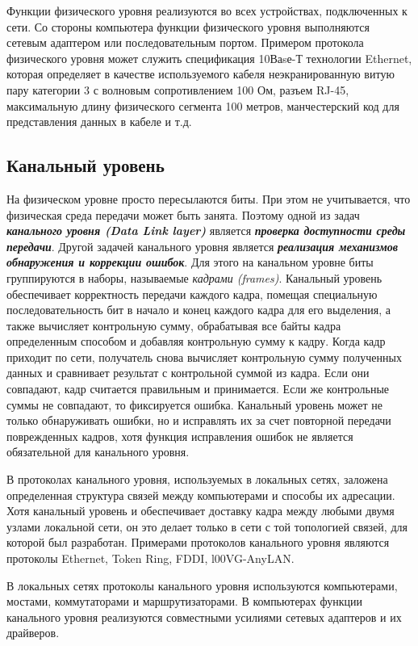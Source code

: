Функции физического уровня реализуются во всех устройствах, подключенных к сети.
Со стороны компьютера функции физического уровня выполняются сетевым адаптером или последовательным портом.
Примером протокола физического уровня может служить спецификация 10Ваsе-Т технологии Ethernet, которая определяет в качестве используемого кабеля неэкранированную витую пару категории 3 с волновым сопротивлением 100 Ом, разъем RJ-45, максимальную длину физического сегмента 100 метров, манчестерский код для представления данных в кабеле и т.д.

\subsection{Канальный уровень}

На физическом уровне просто пересылаются биты.
При этом не учитывается, что физическая среда передачи может быть занята.
Поэтому одной из задач \textbf{\textit{канального уровня (Data Link layer)}} является \textbf{\textit{проверка доступности среды передачи}}.
Другой задачей канального уровня является \textbf{\textit{реализация механизмов обнаружения и коррекции ошибок}}.
Для этого на канальном уровне биты группируются в наборы, называемые \emph{кадрами (frames)}.
Канальный уровень обеспечивает корректность передачи каждого кадра, помещая специальную последовательность бит в начало и конец каждого кадра для его выделения, а также вычисляет контрольную сумму, обрабатывая все байты кадра определенным способом и добавляя контрольную сумму к кадру.
Когда кадр приходит по сети, получатель снова вычисляет контрольную сумму полученных данных и сравнивает результат с контрольной суммой из кадра.
Если они совпадают, кадр считается правильным и принимается.
Если же контрольные суммы не совпадают, то фиксируется ошибка.
Канальный уровень может не только обнаруживать ошибки, но и исправлять их за счет повторной передачи поврежденных кадров, хотя функция исправления ошибок не является обязательной для канального уровня.

В протоколах канального уровня, используемых в локальных сетях, заложена определенная структура связей между компьютерами и способы их адресации.
Хотя канальный уровень и обеспечивает доставку кадра между любыми двумя узлами локальной сети, он это делает только в сети с той топологией связей, для которой был разработан.
Примерами протоколов канального уровня являются протоколы Ethernet, Token Ring, FDDI, l00VG-AnyLAN.

В локальных сетях протоколы канального уровня используются компьютерами, мостами, коммутаторами и маршрутизаторами.
В компьютерах функции канального уровня реализуются совместными усилиями сетевых адаптеров и их драйверов.

